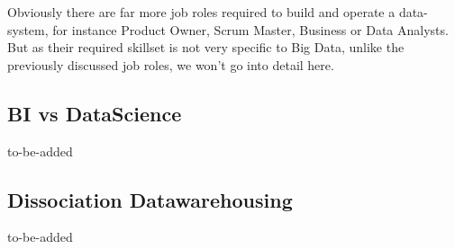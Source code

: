 Obviously there are far more job roles required to build and operate a data-system, for instance Product Owner, Scrum Master, Business or Data Analysts. But as their required skillset is not very specific to Big Data, unlike the previously discussed job roles, we won't go into detail here.

\subsection{BI vs DataScience}
\label{bd_bdib_bi_vs_datascience}
to-be-added


\subsection{Dissociation Datawarehousing}
\label{bd_bdib_diss_dwh}
to-be-added

